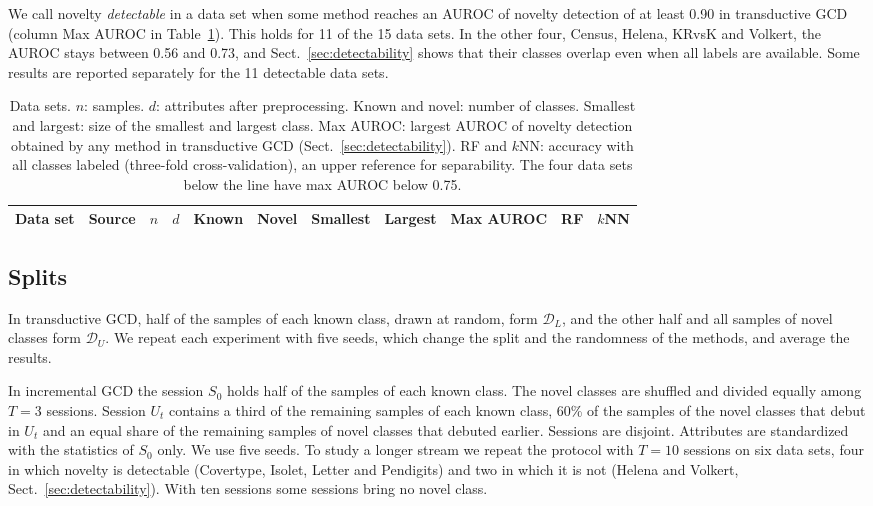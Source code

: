 \documentclass[pdflatex,sn-basic]{sn-jnl}
\newcommand{\DL}{\mathcal{D}_L}
\newcommand{\DU}{\mathcal{D}_U}
\begin{document}
We call novelty \emph{detectable} in a data set when some method reaches an AUROC of novelty detection of at least 0.90 in transductive GCD (column Max AUROC in Table~\ref{tab:datasets}). This holds for 11 of the 15 data sets. In the other four, Census, Helena, KRvsK and Volkert, the AUROC stays between 0.56 and 0.73, and Sect.~\ref{sec:detectability} shows that their classes overlap even when all labels are available. Some results are reported separately for the 11 detectable data sets.

\begin{table}[t]
\caption{Data sets. $n$: samples. $d$: attributes after preprocessing. Known and novel: number of classes. Smallest and largest: size of the smallest and largest class. Max AUROC: largest AUROC of novelty detection obtained by any method in transductive GCD (Sect.~\ref{sec:detectability}). RF and $k$NN: accuracy with all classes labeled (three-fold cross-validation), an upper reference for separability. The four data sets below the line have max AUROC below 0.75.}\label{tab:datasets}
\centering\footnotesize\setlength{\tabcolsep}{4pt}
\begin{tabular}{@{}llrrrrrrrrr@{}}
\toprule
Data set & Source & $n$ & $d$ & Known & Novel & Smallest & Largest & Max AUROC & RF & $k$NN \\
\midrule

\end{tabular}
\end{table}

\subsection{Splits}

In transductive GCD, half of the samples of each known class, drawn at random, form $\DL$, and the other half and all samples of novel classes form $\DU$. We repeat each experiment with five seeds, which change the split and the randomness of the methods, and average the results.

In incremental GCD the session $S_0$ holds half of the samples of each known class. The novel classes are shuffled and divided equally among $T = 3$ sessions. Session $U_t$ contains a third of the remaining samples of each known class, 60\% of the samples of the novel classes that debut in $U_t$ and an equal share of the remaining samples of novel classes that debuted earlier. Sessions are disjoint. Attributes are standardized with the statistics of $S_0$ only. We use five seeds. To study a longer stream we repeat the protocol with $T = 10$ sessions on six data sets, four in which novelty is detectable (Covertype, Isolet, Letter and Pendigits) and two in which it is not (Helena and Volkert, Sect.~\ref{sec:detectability}). With ten sessions some sessions bring no novel class.
\end{document}

